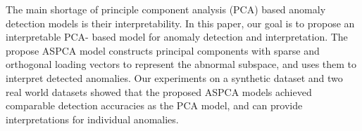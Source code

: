 \begin{eabstract}
	The main shortage of principle component analysis (PCA) based anomaly detection models is their interpretability. In this paper, our goal is to propose an interpretable PCA- based model for anomaly detection and interpretation. The propose ASPCA model constructs principal components with sparse and orthogonal loading vectors to represent the abnormal subspace, and uses them to interpret detected anomalies. Our experiments on a synthetic dataset and two real world datasets showed that the proposed ASPCA models achieved comparable detection accuracies as the PCA model, and can provide interpretations for individual anomalies.
  
\end{eabstract}

